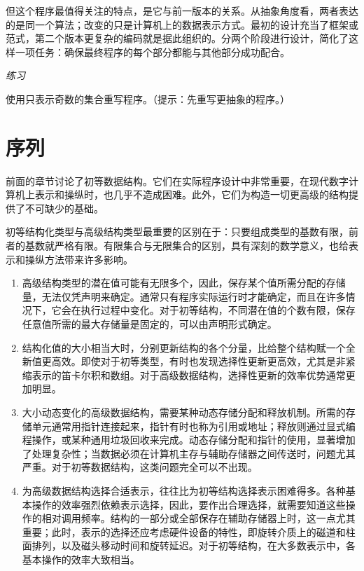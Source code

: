 \documentclass[twoside,11pt,fontset=none]{ctexbook}
\begin{document}
但这个程序最值得关注的特点，是它与前一版本的关系。从抽象角度看，两者表达的是同一个算法；改变的只是计算机上的数据表示方式。最初的设计充当了框架或范式，第二个版本更复杂的编码就是据此组织的。分两个阶段进行设计，简化了这样一项任务：确保最终程序的每个部分都能与其他部分成功配合。

\noindent
\textit{练习}
\nopagebreak

\noindent
使用只表示奇数的集合重写程序。（提示：先重写更抽象的程序。）
\section[序列]{序列}

前面的章节讨论了初等数据结构。它们在实际程序设计中非常重要，在现代数字计算机上表示和操纵时，也几乎不造成困难。此外，它们为构造一切更高级的结构提供了不可缺少的基础。

初等结构化类型与高级结构类型最重要的区别在于：只要组成类型的基数有限，前者的基数就严格有限。有限集合与无限集合的区别，具有深刻的数学意义，也给表示和操纵方法带来许多影响。

\begin{enumerate}[wide, nosep, label=(\arabic*)]
	\item 高级结构类型的潜在值可能有无限多个，因此，保存某个值所需分配的存储量，无法仅凭声明来确定。通常只有程序实际运行时才能确定，而且在许多情况下，它会在执行过程中变化。对于初等结构，不同潜在值的个数有限，保存任意值所需的最大存储量是固定的，可以由声明形式确定。

	\item 结构化值的大小相当大时，分别更新结构的各个分量，比给整个结构赋一个全新值更高效。即使对于初等类型，有时也发现选择性更新更高效，尤其是非紧缩表示的笛卡尔积和数组。对于高级数据结构，选择性更新的效率优势通常更加明显。

	\item 大小动态变化的高级数据结构，需要某种动态存储分配和释放机制。所需的存储单元通常用指针连接起来，指针有时也称为引用或地址；释放则通过显式编程操作，或某种通用垃圾回收来完成。动态存储分配和指针的使用，显著增加了处理复杂性；当数据必须在计算机主存与辅助存储器之间传送时，问题尤其严重。对于初等数据结构，这类问题完全可以不出现。

	\item 为高级数据结构选择合适表示，往往比为初等结构选择表示困难得多。各种基本操作的效率强烈依赖表示选择，因此，要作出合理选择，就需要知道这些操作的相对调用频率。结构的一部分或全部保存在辅助存储器上时，这一点尤其重要；此时，表示的选择还应考虑硬件设备的特性，即旋转介质上的磁道和柱面排列，以及磁头移动时间和旋转延迟。对于初等结构，在大多数表示中，各基本操作的效率大致相当。
\end{enumerate}
\end{document}
